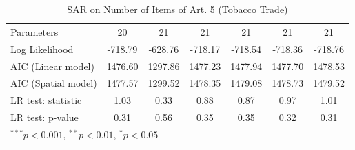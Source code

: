 \begin{table}[!h]
\begin{center}
\begin{tabular}{l c c c c c c }
Parameters              & 20           & 21           & 21           & 21           & 21           & 21           \\
Log Likelihood          & -718.79      & -628.76      & -718.17      & -718.54      & -718.36      & -718.76      \\
AIC (Linear model)      & 1476.60      & 1297.86      & 1477.23      & 1477.94      & 1477.70      & 1478.53      \\
AIC (Spatial model)     & 1477.57      & 1299.52      & 1478.35      & 1479.08      & 1478.73      & 1479.52      \\
LR test: statistic      & 1.03         & 0.33         & 0.88         & 0.87         & 0.97         & 1.01         \\
LR test: p-value        & 0.31         & 0.56         & 0.35         & 0.35         & 0.32         & 0.31         \\
\bottomrule
\multicolumn{7}{l}{\scriptsize{$^{***}p<0.001$, $^{**}p<0.01$, $^*p<0.05$}}
\end{tabular}
\caption{SAR on Number of Items of Art. 5 (Tobacco Trade)}
\label{table:coefficients}
\end{center}
\end{table}
